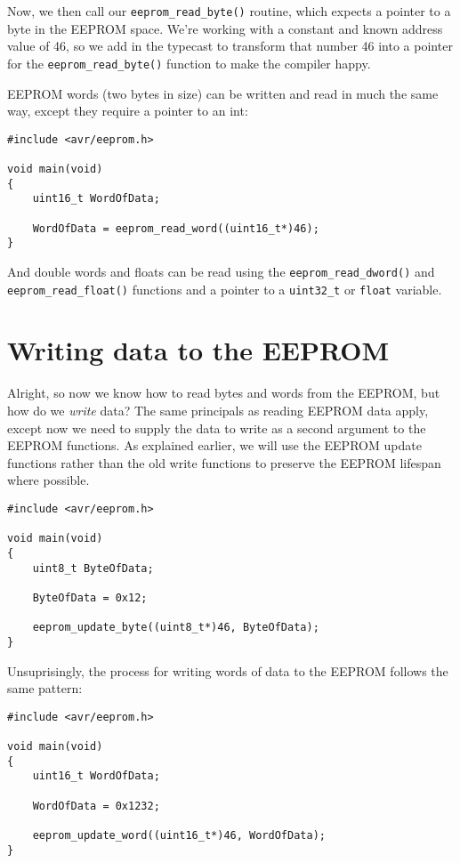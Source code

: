 \documentclass[a4paper,oneside,notitlepage]{book}
\begin{document}
Now, we then call our \lstinline{eeprom_read_byte()} routine, which expects a pointer to a byte in the EEPROM space. We're working with a constant and known address value of 46, so we add in the typecast to transform that number 46 into a pointer for the \lstinline{eeprom_read_byte()} function to make the compiler happy.

EEPROM words (two bytes in size) can be written and read in much the same way, except they require a pointer to an int:

\begin{center}
\begin{lstlisting}
#include <avr/eeprom.h>

void main(void)
{
    uint16_t WordOfData;

    WordOfData = eeprom_read_word((uint16_t*)46);
}
\end{lstlisting}
\end{center}

And double words and floats can be read using the \lstinline{eeprom_read_dword()} and \lstinline{eeprom_read_float()} functions and a pointer to a \lstinline{uint32_t} or \lstinline{float} variable.

\chapter{Writing data to the EEPROM}

Alright, so now we know how to read bytes and words from the EEPROM, but how do we \textit{write} data? The same principals as reading EEPROM data apply, except now we need to supply the data to write as a second argument to the EEPROM functions. As explained earlier, we will use the EEPROM update functions rather than the old write functions to preserve the EEPROM lifespan where possible.

\begin{center}
\begin{lstlisting}
#include <avr/eeprom.h>

void main(void)
{
    uint8_t ByteOfData;
	
    ByteOfData = 0x12;

    eeprom_update_byte((uint8_t*)46, ByteOfData);
}
\end{lstlisting}
\end{center}

Unsuprisingly, the process for writing words of data to the EEPROM follows the same pattern:

\begin{center}
\begin{lstlisting}
#include <avr/eeprom.h>

void main(void)
{
    uint16_t WordOfData;
	
    WordOfData = 0x1232;

    eeprom_update_word((uint16_t*)46, WordOfData);
}
\end{lstlisting}
\end{center}
\end{document}
